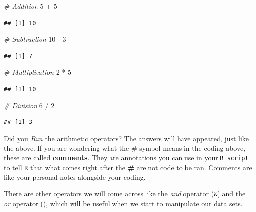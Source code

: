 \documentclass[
]{book}
\newenvironment{Shaded}{\begin{snugshade}}{\end{snugshade}}
\newcommand{\CommentTok}[1]{\textcolor[rgb]{0.56,0.35,0.01}{\textit{#1}}}
\newcommand{\DecValTok}[1]{\textcolor[rgb]{0.00,0.00,0.81}{#1}}
\newcommand{\SpecialCharTok}[1]{\textcolor[rgb]{0.00,0.00,0.00}{#1}}
\begin{document}
\begin{Shaded}
\begin{Highlighting}[]
\CommentTok{\# Addition}
\DecValTok{5} \SpecialCharTok{+} \DecValTok{5}
\end{Highlighting}
\end{Shaded}

\begin{verbatim}
## [1] 10
\end{verbatim}

\begin{Shaded}
\begin{Highlighting}[]
\CommentTok{\# Subtraction}
\DecValTok{10} \SpecialCharTok{{-}} \DecValTok{3}
\end{Highlighting}
\end{Shaded}

\begin{verbatim}
## [1] 7
\end{verbatim}

\begin{Shaded}
\begin{Highlighting}[]
\CommentTok{\# Multiplication}
\DecValTok{2} \SpecialCharTok{*} \DecValTok{5}
\end{Highlighting}
\end{Shaded}

\begin{verbatim}
## [1] 10
\end{verbatim}

\begin{Shaded}
\begin{Highlighting}[]
\CommentTok{\# Division}
\DecValTok{6} \SpecialCharTok{/} \DecValTok{2}
\end{Highlighting}
\end{Shaded}

\begin{verbatim}
## [1] 3
\end{verbatim}

Did you \emph{Run} the arithmetic operators? The answers will have appeared, just like the above. If you are wondering what the \# symbol means in the coding above, these are called \textbf{comments}. They are annotations you can use in your \texttt{R\ script} to tell \texttt{R} that what comes right after the \textbf{\#} are not code to be ran. Comments are like your personal notes alongside your coding.

There are other operators we will come across like the \emph{and} operator (\texttt{\&}) and the \emph{or} operator (\texttt{\textbar{}}), which will be useful when we start to manipulate our data sets.
\end{document}
